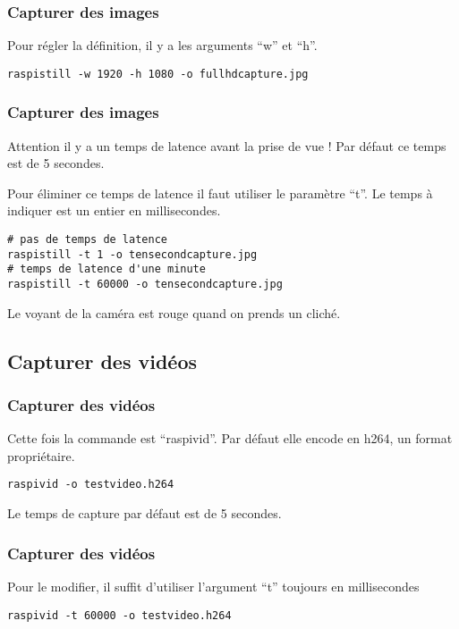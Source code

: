 \begin{frame}[containsverbatim]
\frametitle{Capturer des images}

Pour régler la définition, il y a les arguments ``w'' et ``h''.

\begin{verbatim}
raspistill -w 1920 -h 1080 -o fullhdcapture.jpg
\end{verbatim}

\end{frame}

\begin{frame}[containsverbatim]
\frametitle{Capturer des images}

Attention il y a un temps de latence avant la prise de vue ! Par défaut ce temps est de 5 secondes.

Pour éliminer ce temps de latence il faut utiliser le paramètre ``t''. Le temps à indiquer est un entier en millisecondes.

\begin{verbatim}
# pas de temps de latence
raspistill -t 1 -o tensecondcapture.jpg
# temps de latence d'une minute
raspistill -t 60000 -o tensecondcapture.jpg
\end{verbatim}

Le voyant de la caméra est rouge quand on prends un cliché.

\end{frame}


\subsection{Capturer des vidéos}

\begin{frame}[containsverbatim]
\frametitle{Capturer des vidéos}

Cette fois la commande est ``raspivid''. Par défaut elle encode en h264, un format propriétaire.

\begin{verbatim}
raspivid -o testvideo.h264
\end{verbatim}

Le temps de capture par défaut est de 5 secondes. 

\end{frame}

\begin{frame}[containsverbatim]
\frametitle{Capturer des vidéos}

Pour le modifier, il suffit d'utiliser l'argument ``t'' toujours en millisecondes

\begin{verbatim}
raspivid -t 60000 -o testvideo.h264
\end{verbatim}

\end{frame}

